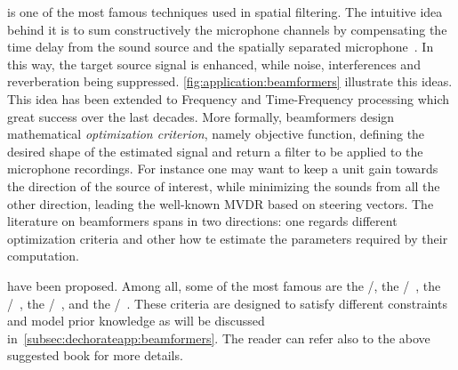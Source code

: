  is one of the most famous techniques used in spatial filtering.
The intuitive idea behind it is to sum constructively the microphone channels by compensating the time delay from the sound source and the spatially separated microphone~.
In this way, the target source signal is enhanced, while noise, interferences and reverberation being suppressed.
\cref{fig:application:beamformers} illustrate this ideas.
This idea has been extended to Frequency and Time-Frequency processing which great success over the last decades.
More formally, beamformers design mathematical \textit{optimization criterion}, namely objective function, defining the desired shape of the estimated signal and return a filter to be applied to the microphone recordings.
For instance one may want to keep a unit gain towards the direction of the source of interest, while minimizing the sounds from all the other direction, leading the well-known
\acf{MVDR} based on steering vectors.
The literature on beamformers spans in two directions: one regards different optimization criteria and other how te estimate the parameters required by their computation.

 have been proposed.
Among all, some of the most famous are the \DStxt/, the \MVDRtxt/~, the \MaxSNRtxt/~, the \MaxSINRtxt/~, and the \LCMVtxt/~.
These criteria are designed to satisfy different constraints and model prior knowledge as will be discussed in~\cref{subsec:dechorateapp:beamformers}.
The reader can refer also to the above suggested book for more details.

